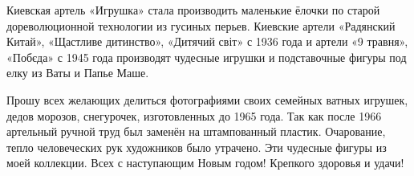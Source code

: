 Киевская артель «Игрушка» стала производить маленькие ёлочки по старой
дореволюционной технологии из гусиных перьев. Киевские артели «Радянский
Китай», «Щастливе дитинство», «Дитячий світ» с 1936 года и артели «9 травня»,
«Побєда» с 1945 года производят чудесные игрушки и подставочные фигуры под елку
из Ваты и Папье Маше.  


Прошу всех желающих делиться фотографиями своих семейных ватных игрушек,
дедов морозов, снегурочек, изготовленных до 1965 года. Так как после 1966
артельный ручной труд был заменён на штампованный пластик. Очарование, тепло
человеческих рук художников было утрачено.  Эти чудесные фигуры из моей
коллекции. Всех с наступающим Новым годом! Крепкого здоровья и удачи!

